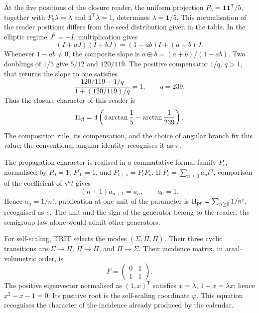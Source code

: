 At the five positions of the closure reader, the uniform projection
\(P_5=\mathbf1\mathbf1^{\mathsf T}/5\), together with
\(P_5\lambda=\lambda\) and \(\mathbf1^{\mathsf T}\lambda=1\), determines
\(\lambda=\mathbf1/5\). This normalisation of the reader positions
differs from the seed distribution given in the table.
In the elliptic regime \(J^2=-I\), multiplication gives
\[
(I+aJ)(I+bJ)=(1-ab)I+(a+b)J.
\]
Whenever \(1-ab\ne0\), the composite slope is
\(a\oplus b=(a+b)/(1-ab)\). Two doublings of \(1/5\) give
\(5/12\) and \(120/119\). The positive compensator \(1/q\), \(q>1\),
that returns the slope to one satisfies
\[
\frac{120/119-1/q}{1+(120/119)/q}=1,
\qquad q=239.
\]
Thus the closure character of this reader is
\begin{equation}
 \Pi_{\rm cl}=4\left(4\arctan\frac15-\arctan\frac1{239}\right).
 \label{vi:dep:lector-clausura}
\end{equation}
The composition rule, its compensation, and the choice of angular branch
fix this value; the conventional angular identity recognises it as \(\pi\).

The propagation character is realised in a commutative formal family
\(P_t\), normalised by \(P_0=1\), \(P'_0=1\), and
\(P_{t+s}=P_tP_s\). If \(P_t=\sum_{n\ge0}a_nt^n\), comparison
of the coefficient of \(s^nt\) gives
\[
 (n+1)a_{n+1}=a_n,\qquad a_0=1.
\]
Hence \(a_n=1/n!\); publication at one unit of the parameter is
\(\Pi_{\rm pr}=\sum_{n\ge0}1/n!\), recognised as \(e\).
The unit and the sign of the generator belong to the reader: the semigroup
law alone would admit other generators.

For self-scaling, TRIT selects the modes
\((\Sigma,\Pi,\Pi)\). Their three cyclic transitions are
\(\Sigma\to\Pi\), \(\Pi\to\Pi\), and \(\Pi\to\Sigma\). Their incidence
matrix, in areal--volumetric order, is
\begin{equation}
 F=\begin{pmatrix}0&1\\1&1\end{pmatrix}.
 \label{vi:dep:incidencia-hojas}
\end{equation}
The positive eigenvector normalised as \((1,x)^{\mathsf T}\)
satisfies \(x=\lambda\), \(1+x=\lambda x\); hence
\(x^2-x-1=0\). Its positive root is the self-scaling coordinate
\(\varphi\). This equation recognises the character of the incidence already
produced by the calendar.

